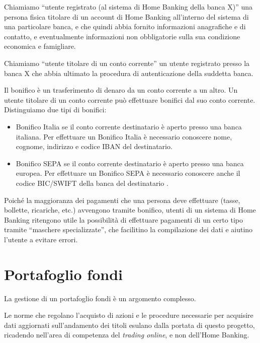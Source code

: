 \documentclass[10pt]{softeng} %
\begin{document}
Chiamiamo ``utente registrato (al sistema di Home Banking della banca X)'' una persona fisica titolare di un account di Home Banking all'interno del sistema di una particolare banca, e che quindi abbia fornito informazioni anagrafiche e di contatto, e eventualmente informazioni non obbligatorie sulla sua condizione economica e famigliare.

Chiamiamo ``utente titolare di un conto corrente'' un utente registrato presso la banca X che abbia ultimato la procedura di autenticazione della suddetta banca.

Il bonifico \`e un trasferimento di denaro da un conto corrente a un altro.
Un utente titolare di un conto corrente pu\`o effettuare bonifici dal suo conto corrente.
Distinguiamo due tipi di bonifici:
\begin{itemize}
	\item Bonifico Italia se il conto corrente destinatario \`e aperto presso una banca italiana.
	Per effettuare un Bonifico Italia \`e necessario conoscere nome, cognome, indirizzo e codice IBAN del destinatario.
	\item Bonifico SEPA se il conto corrente destinatario \`e aperto presso una banca europea. Per effettuare un Bonifico SEPA \`e necessario conoscere anche il codice BIC/SWIFT della banca del destinatario \cite{bonifico_unicredit}.
\end{itemize}
Poich\'e la maggioranza dei pagamenti che una persona deve effettuare (tasse, bollette, ricariche, etc.) avvengono tramite bonifico, utenti di un sistema di Home Banking ritengono utile la possibilit\`a di effettuare pagamenti di un certo tipo tramite ``maschere specializzate'', che facilitino la compilazione dei dati e aiutino l'utente a evitare errori.



\section{Portafoglio fondi}

La gestione di un portafoglio fondi \`e un argomento complesso.

Le norme che regolano l'acquisto di azioni e le procedure necessarie per acquisire dati aggiornati sull'andamento dei titoli esulano dalla portata di questo progetto, ricadendo nell'area di competenza del \emph{trading online}, e non dell'Home Banking.
\end{document}
